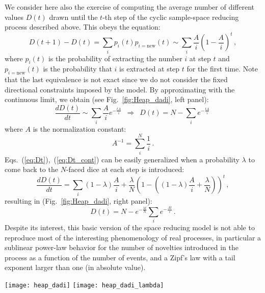 \documentclass[graybox]{svmult}
\begin{document}
We consider here also the exercise of computing the average number of different values
$D(t)$ drawn until the $t$-th
step of the cyclic sample-space reducing process described above.
This obeys the equation:
%
\begin{equation} \label{eq:Dt}
D(t+1) -D (t) = \sum_i p_i (t) p_{i=\mathrm{new}} (t) \sim \sum_i \frac{A}{i} \left(1-
\frac{A}{i} \right)^t  \, ,
\end{equation}
%
where $ p_i (t) $  is the probability of extracting the
number $i$ at step $t$ and  $ p_{i=\mathrm{new}} (t) $ is the probability
that $i$ is extracted at step $t$ for the first time.  Note that the last
equivalence is not exact since we  do not consider the fixed directional
constraints imposed by the model.
 By approximating with the continuous limit, we obtain  (see
 Fig.~\ref{fig:Heap_dadi}, left panel):
%
\begin{equation} \label{eq:Dt_cont}
\frac{d D(t)}{dt} \sim \sum_i \frac{A}{i}  e^{-\frac{t A}{i} } \, \,\,
\Rightarrow \, \,\,  D(t)= N - \sum_i  e^{-\frac{t A}{i} }
\,
\end{equation}
%
where $A$ is the normalization constant:
%
\begin{equation}
A^{-1}= \sum_i^N \frac{1}{i} \,.
\end{equation}
%
Eqs.~(\ref{eq:Dt}),~(\ref{eq:Dt_cont}) can be easily generalized
when  a probability $\lambda$ to come
 back to the $N$-faced dice at each step is introduced:
\begin{equation}
\frac{d D(t)}{dt}= \sum_i (1-\lambda) \frac{A}{i} + \frac{\lambda }{N}\left(1-((1-\lambda) \frac{A}{i} + \frac{\lambda }{N}
) \right)^t \, ,
\end{equation}
%
resulting in (Fig.~\ref{fig:Heap_dadi}, right panel):
%
\begin{equation}\label{eq:Dt_dadigen}
D(t)= N -  e^{ -\frac{\lambda t}{N} }\sum_i e^{ -\frac{A t}{i}}  \,.
\end{equation}
%
Despite its interest, this basic version of the space
reducing model is not able to reproduce most of the interesting
phenomenology of real processes, in particular a sublinear power-law
behavior for the number of novelties introduced in the process as a
function of the number of events, and a Zipf's law with  a tail exponent
larger than one (in absolute value).

\begin{figure*}[t]
\centering
\texttt{[image: heap\_dadi]}%
\texttt{[image: heap\_dadi\_lambda]}
\caption{ {\bf Heap's law in the sample-space reducing model.} Left:
  model with $\lambda=0$. Right: model with $\lambda=0.3$. In both
  cases results are shown for $N=1000,10000,100000$, and the x and y
  axes are suitably normalized in order to superimpose the different
  curves. The curves with both $\lambda=0$ and $\lambda=0.3$ are
  well fitted with a constant plus a stretched exponential function: $f(x)=(1-
  \exp(-cx^b))$, with  $ c=1.8, b=0.775$ for $\lambda=0$, and  $c=0.6,
  b=0.9$ for $\lambda=0.3$.  In both figures the straight black
line corresponds to $y\propto x$.
\label{fig:Heap_dadi}}
\end{figure*}
\end{document}

